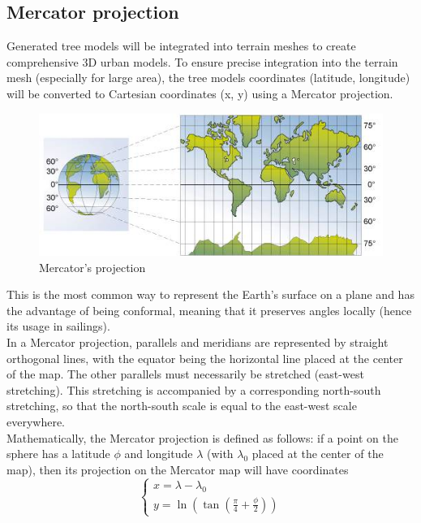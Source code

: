 \documentclass[12pt]{article}
\begin{document}
\subsection{Mercator projection}

Generated tree models will be integrated into terrain meshes to create comprehensive
3D urban models. To ensure precise integration into the terrain mesh (especially for large area), the tree models coordinates
(latitude, longitude) will be converted to Cartesian coordinates (x, y) using
a Mercator projection\cite{mercator-proj}.

\begin{figure}[H]
    \centering
    \includegraphics[width=1\textwidth]{images/mercator.jpg}
    \caption{Mercator's projection\cite{img:mercator}}
\end{figure}

This is the most common way to represent the Earth's surface on a plane and has 
the advantage of being conformal, meaning that it preserves angles locally (hence
 its usage in sailings). \\
 In a Mercator projection, parallels and meridians are represented by straight 
 orthogonal lines, with the equator being the horizontal line placed at the center
  of the map. The other parallels must necessarily be stretched (east-west 
  stretching). This stretching is accompanied by a corresponding north-south 
  stretching, so that the north-south scale is equal to the east-west scale 
  everywhere. \\
  Mathematically, the Mercator projection is defined as follows: if a point on 
  the sphere has a latitude $\phi$ and longitude $\lambda$ (with $\lambda_{0}$ 
  placed at the center of the map), then its projection on the Mercator map will 
  have coordinates 
  \begin{equation}
    \left\{
    \begin{array}{l}
        x =  \lambda - \lambda_{0} \\
        y =  \ln(\tan(\frac{\pi}{4} + \frac{\phi}{2}))
    \end{array}
    \right.
\end{equation}
\end{document}
